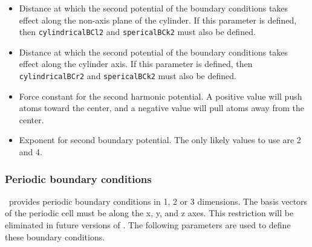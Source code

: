 \begin{itemize}
\item
{}
{Distance at which the second potential of the boundary conditions takes
effect along the non-axis plane of the cylinder.
If this parameter is defined, then {\tt cylindricalBCl2} and {\tt spericalBCk2} must also
be defined.}

\item
{}
{Distance at which the second potential of the boundary conditions takes
effect along the cylinder axis.
If this parameter is defined, then {\tt cylindricalBCr2} and {\tt spericalBCk2} must also
be defined.}

\item
{}
{Force constant for the second harmonic potential.  A positive
value will push atoms toward the center, and a negative
value will pull atoms away from the center.}

\item
{}
{Exponent for second boundary potential.  The only likely values to
use are 2 and 4.}

\end{itemize}

%
%
%
%
%

\subsubsection{Periodic boundary conditions}

\NAMD\ provides periodic boundary conditions in 1, 2 or 3 dimensions.
The basis vectors of the periodic cell must be along the x, y, and z axes.  
This restriction will be eliminated in future versions of \NAMD.
The following parameters are used to define these boundary conditions.  

